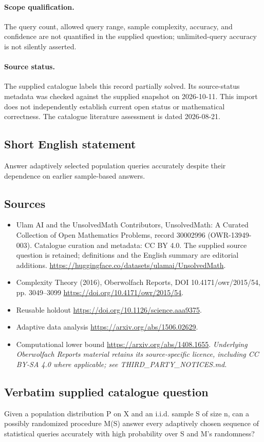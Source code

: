 \documentclass[11pt]{article}
\begin{document}
\paragraph{Scope qualification.}
The query count, allowed query range, sample complexity, accuracy, and confidence are not quantified in the supplied question; unlimited-query accuracy is not silently asserted.
\paragraph{Source status.}
The supplied catalogue labels this record partially solved. Its source-status metadata was checked against the supplied snapshot on 2026-10-11. This import does not independently establish current open status or mathematical correctness. The catalogue literature assessment is dated 2026-08-21.
\subsection{Short English statement}
Answer adaptively selected population queries accurately despite their dependence on earlier sample-based answers.
\subsection{Sources}
\begin{itemize}
\item[S1] Ulam AI and the UnsolvedMath Contributors, UnsolvedMath: A Curated Collection of Open Mathematics Problems, record 30002996 (OWR-13949-003). Catalogue curation and metadata: CC BY 4.0. The supplied source question is retained; definitions and the English summary are editorial additions.
\url{https://huggingface.co/datasets/ulamai/UnsolvedMath}.
\item[S2] Complexity Theory (2016), Oberwolfach Reports, DOI 10.4171/owr/2015/54, pp. 3049--3099
\url{https://doi.org/10.4171/owr/2015/54}.
\item[S3] Reusable holdout
\url{https://doi.org/10.1126/science.aaa9375}.
\item[S4] Adaptive data analysis
\url{https://arxiv.org/abs/1506.02629}.
\item[S5] Computational lower bound
\url{https://arxiv.org/abs/1408.1655}.
\textit{Underlying Oberwolfach Reports material retains its source-specific licence, including CC BY-SA 4.0 where applicable; see THIRD\_PARTY\_NOTICES.md.}
\end{itemize}
\subsection{Verbatim supplied catalogue question}
Given a population distribution P on X and an i.i.d. sample S of size n, can a possibly randomized procedure M(S) answer every adaptively chosen sequence of statistical queries accurately with high probability over S and M's randomness?
\end{document}
